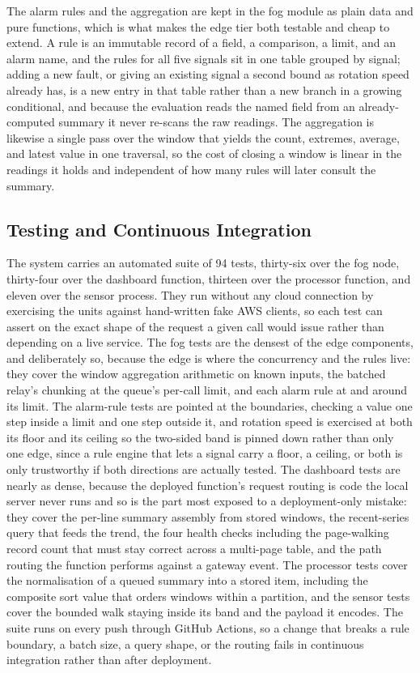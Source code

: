 \documentclass[conference]{IEEEtran}
\begin{document}
The alarm rules and the aggregation are kept in the fog module as plain data and pure functions, which is what makes the edge tier both testable and cheap to extend. A rule is an immutable record of a field, a comparison, a limit, and an alarm name, and the rules for all five signals sit in one table grouped by signal; adding a new fault, or giving an existing signal a second bound as rotation speed already has, is a new entry in that table rather than a new branch in a growing conditional, and because the evaluation reads the named field from an already-computed summary it never re-scans the raw readings. The aggregation is likewise a single pass over the window that yields the count, extremes, average, and latest value in one traversal, so the cost of closing a window is linear in the readings it holds and independent of how many rules will later consult the summary.

\subsection{Testing and Continuous Integration}

The system carries an automated suite of 94 tests, thirty-six over the fog node, thirty-four over the dashboard function, thirteen over the processor function, and eleven over the sensor process. They run without any cloud connection by exercising the units against hand-written fake AWS clients, so each test can assert on the exact shape of the request a given call would issue rather than depending on a live service. The fog tests are the densest of the edge components, and deliberately so, because the edge is where the concurrency and the rules live: they cover the window aggregation arithmetic on known inputs, the batched relay's chunking at the queue's per-call limit, and each alarm rule at and around its limit. The alarm-rule tests are pointed at the boundaries, checking a value one step inside a limit and one step outside it, and rotation speed is exercised at both its floor and its ceiling so the two-sided band is pinned down rather than only one edge, since a rule engine that lets a signal carry a floor, a ceiling, or both is only trustworthy if both directions are actually tested. The dashboard tests are nearly as dense, because the deployed function's request routing is code the local server never runs and so is the part most exposed to a deployment-only mistake: they cover the per-line summary assembly from stored windows, the recent-series query that feeds the trend, the four health checks including the page-walking record count that must stay correct across a multi-page table, and the path routing the function performs against a gateway event. The processor tests cover the normalisation of a queued summary into a stored item, including the composite sort value that orders windows within a partition, and the sensor tests cover the bounded walk staying inside its band and the payload it encodes. The suite runs on every push through GitHub Actions, so a change that breaks a rule boundary, a batch size, a query shape, or the routing fails in continuous integration rather than after deployment.
\end{document}
